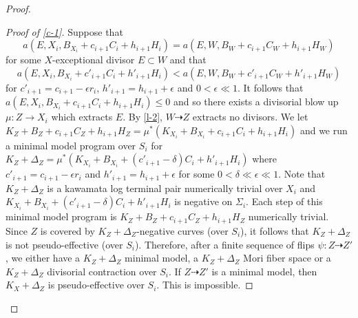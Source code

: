 \documentclass[12pt]{amsart}
\theoremstyle{plain}
\begin{document}
\begin{proof}
\begin{proof}[Proof of \ref{c-1}]
Suppose that \begin{equation}\label{e-d} a(E,X_i,B_{X_i}+c_{i+1}C_i+h_{i+1}H_i)= 
a(E,W,B_W+c_{i+1}C_W+h_{i+1}H_W)\end{equation} for some $X$-exceptional
divisor $E\subset W$ and that \begin{equation}\label{e-e} a(E,X_i,B_{X_i}+c'_{i+1}C_i+h'_{i+1}H_i)< 
a(E,W,B_W+c'_{i+1}C_W+h'_{i+1}H_W)\end{equation}
for $c'_{i+1}=c_{i+1}-\epsilon r_i$, $h'_{i+1}=h_{i+1}+\epsilon$ and
$0<\epsilon \ll 1$. 
It follows that 
$a(E,X_i,B_{X_i}+c_{i+1}C_i+h_{i+1}H_i)\leq 0$ and so there
exists a divisorial blow up $\mu :Z\to X_i$ which extracts $E$.
By \eqref{l-2}, $W\dasharrow Z$ extracts no divisors.
We let $K_Z+B_Z+c_{i+1}C_Z+h_{i+1}H_Z=\mu ^*(K_{X_i}+B_{X_i}+c_{i+1}C_i+h_{i+1}H_i)$ and we run a minimal model program over $S_i$ for $K_Z+\Delta _Z=
\mu ^*(K_{X_i}+B_{X_i}+(c'_{i+1}-\delta)C_i+h'_{i+1}H_i)$
where $c'_{i+1}=c_{i+1}-\epsilon r_i$ and $h'_{i+1}=h_{i+1}+\epsilon$
for some $0<\delta \ll \epsilon \ll 1$. Note that $K_Z+\Delta _Z$ is a 
kawamata log terminal pair numerically trivial over $X_i$ 
and $K_{X_i}+B_{X_i}+(c'_{i+1}-\delta)C_i+h'_{i+1}H_i$
is negative on $\Sigma _i$.
Each step of this minimal model program is $K_Z+B_Z+c_{i+1}C_Z+h_{i+1}H_Z$
numerically trivial. Since $Z$ is covered by $K_Z+\Delta _Z$-negative
curves (over $S_i$), it follows that $K_Z+\Delta _Z$ is not 
pseudo-effective (over $S_i$). 
Therefore, after a finite sequence of flips $\psi :Z\dasharrow Z'$, we either have a $K_Z+\Delta _Z$ minimal model, a $K_Z+\Delta _Z$ Mori fiber space or a $K_Z+\Delta _Z$ divisorial contraction over $S_i$.
If $Z\dasharrow Z'$ is a minimal model, then $K_X+\Delta _Z$ is pseudo-effective over $S_i$. This is impossible.


\end{proof}
\end{proof}
\end{document}
